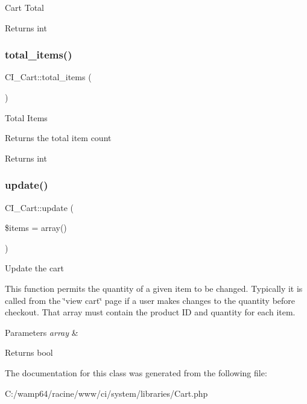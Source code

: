 Cart Total

\begin{DoxyReturn}{Returns}
int 
\end{DoxyReturn}
\mbox{\label{class_c_i___cart_a580f84b961eed3024e6a9566e4a17874}} 
\subsubsection{\texorpdfstring{total\+\_\+items()}{total\_items()}}
{\footnotesize\ttfamily C\+I\+\_\+\+Cart\+::total\+\_\+items (\begin{DoxyParamCaption}{ }\end{DoxyParamCaption})}

Total Items

Returns the total item count

\begin{DoxyReturn}{Returns}
int 
\end{DoxyReturn}
\mbox{\label{class_c_i___cart_a8839ef38bd59aa82545048a59b12dd51}} 
\subsubsection{\texorpdfstring{update()}{update()}}
{\footnotesize\ttfamily C\+I\+\_\+\+Cart\+::update (\begin{DoxyParamCaption}\item[{}]{\$items = {\ttfamily array()} }\end{DoxyParamCaption})}

Update the cart

This function permits the quantity of a given item to be changed. Typically it is called from the \char`\"{}view cart\char`\"{} page if a user makes changes to the quantity before checkout. That array must contain the product ID and quantity for each item.


\begin{DoxyParams}{Parameters}
{\em array} & \\
\hline
\end{DoxyParams}
\begin{DoxyReturn}{Returns}
bool 
\end{DoxyReturn}


The documentation for this class was generated from the following file\+:\begin{DoxyCompactItemize}
\item 
C\+:/wamp64/racine/www/ci/system/libraries/Cart.\+php\end{DoxyCompactItemize}
